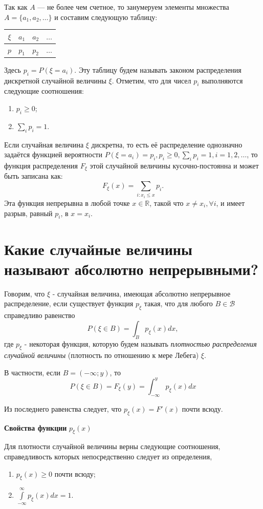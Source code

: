 Так как $A$ — не более чем счетное, то занумеруем элементы множества $A = \{ a_1, a_2, \dots \}$ и составим следующую таблицу:
\begin{table}[H]
	\centering
	\begin{tabular}{|c|c|c|c|}
		\hline
		$\xi$ & $a_1$ & $a_2$ & $\dots$ \\ \hline
		$p$   & $p_1$ & $p_2$ & $\dots$ \\ \hline
	\end{tabular}
\end{table}
Здесь $p_i = P(\xi = a_i)$. Эту таблицу будем называть законом распределения дискретной случайной величины $\xi$. Отметим, что для чисел $p_i$ выполняются следующие соотношения:
\begin{enumerate}
	\item $p_i \ge 0$;
	\item $\sum\limits_{i} p_i = 1$.
\end{enumerate}

Если случайная величина $\xi$ дискретна, то есть её распределение однозначно задаётся функцией вероятности $P(\xi = a_i) = p_i, p_i \ge 0, \sum\limits_i p_i = 1, i = 1,2,\dots$, то функция распределения $F_{\xi}$ этой случайной величины кусочно-постоянна и может быть записана как:
\[ F_{\xi} (x) = \sum_{i: x_i \le x} p_i. \]
Эта функция непрерывна в любой точке $x \in \mathbb{R}$, такой что $x \ne x_i, \forall i$, и имеет разрыв, равный $p_i$, в $x = x_i$.

\section{Какие случайные величины называют абсолютно непрерывными?}

Говорим, что $\xi$ - случайная величина, имеющая абсолютно непрерывное распределение, если существует функция $p_{\xi}$ такая, что для любого $B \in \mathcal{B}$ справедливо равенство
\[ P(\xi \in B) = \int_B p_{\xi} (x) dx, \]
где $p_{\xi}$ - некоторая функция, которую будем называть \textit{плотностью распределения случайной величины} (плотность по отношению к мере Лебега) $\xi$.

В частности, если $B = (-\infty; y)$, то
\[ P(\xi \in B) = F_{\xi} (y) = \int_{-\infty}^{y} p_{\xi} (x) dx \]

Из последнего равенства следует, что $p_{\xi} (x) = F' (x)$ почти всюду.

\textbf{Свойства функции} $p_{\xi} (x)$

Для плотности случайной величины верны следующие соотношения, справедливость которых непосредственно следует из определения,
\begin{enumerate}
	\item $p_{\xi} (x) \ge 0$ почти всюду;
	\item $\int\limits_{-\infty}^{\infty} p_{\xi} (x) dx = 1$.
\end{enumerate}

